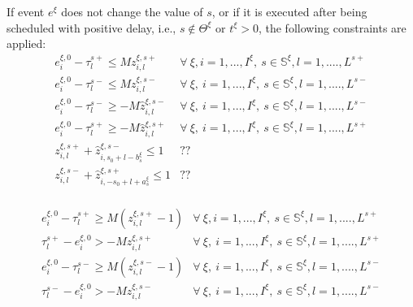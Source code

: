 \documentclass[]{interact}
\theoremstyle{plain}%
\theoremstyle{definition}
\theoremstyle{remark}
\begin{document}
If event $e^{\xi}$ does not change the value of $s$, or if it is executed after being scheduled with positive delay, i.e., $s\notin \Theta^{\xi}$ or $t^{\xi}>0$, the following constraints are applied:
\begin{eqnarray}
e^{\xi,0}_{i} - \tau_{l}^{s+} \le Mz^{\xi,s+}_{i,l} & \forall\ \xi,i=1,...,I^{\xi},\ s\in \mathbb{S}^{\xi}, l=1,....,L^{s+}\\
e^{\xi,0}_{i} - \tau_{l}^{s-} \le Mz^{\xi,s-}_{i,l} & \forall\ \xi,\ i=1,...,I^{\xi},\ s\in \mathbb{S}^{\xi}, l=1,....,L^{s-}\\
e^{\xi,0}_{i} - \tau_{l}^{s-} \ge -M\hat{z}^{\xi,s-}_{i,l}& \forall\ \xi,\ i=1,...,I^{\xi},\ s\in \mathbb{S}^{\xi}, l=1,....,L^{s-}\\
e^{\xi,0}_{i} - \tau_{l}^{s+} \ge -M\hat{z}^{\xi,s+}_{i,l}& \forall\ \xi,\ i=1,...,I^{\xi},\ s\in \mathbb{S}^{\xi}, l=1,....,L^{s+}\\
z^{\xi,s+}_{i,l}+\hat{z}^{\xi,s-}_{i,s_0+l-b^{\xi}_{s}}\le 1&??\\
z^{\xi,s-}_{i,l}+\hat{z}^{\xi,s+}_{i,-s_0+l+a^{\xi}_{s}}\le 1&??\\
\end{eqnarray}

\begin{eqnarray}
e^{\xi,0}_{i} - \tau_{l}^{s+} \ge M(z^{\xi,s+}_{i,l}-1) & \forall\ \xi,i=1,...,I^{\xi},\ s\in \mathbb{S}^{\xi}, l=1,....,L^{s+}\\
\tau_{l}^{s+} - e^{\xi,0}_{i} > -Mz^{\xi,s+}_{i,l}& \forall\ \xi,\ i=1,...,I^{\xi},\ s\in \mathbb{S}^{\xi}, l=1,....,L^{s+}\\
e^{\xi,0}_{i} - \tau_{l}^{s-} \ge M(z^{\xi,s-}_{i,l}-1) & \forall\ \xi,\ i=1,...,I^{\xi},\ s\in \mathbb{S}^{\xi}, l=1,....,L^{s-}\\
\tau_{l}^{s-} - e^{\xi,0}_{i} > -Mz^{\xi,s-}_{i,l}& \forall\ \xi,\ i=1,...,I^{\xi},\ s\in \mathbb{S}^{\xi}, l=1,....,L^{s-}\\
\end{eqnarray}
\end{document}
